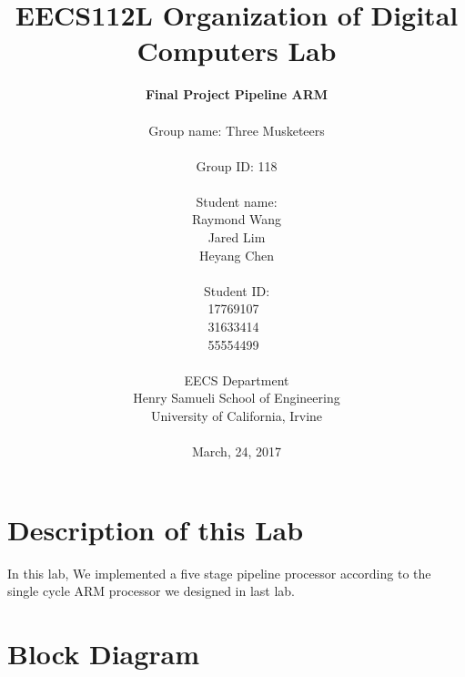 \documentclass{article}
\begin{document}
\title{EECS112L Organization of Digital Computers Lab}
\author{\textbf{Final Project} \textbf{Pipeline ARM} \\ \\
Group name: Three Musketeers \\ \\ Group ID: 118 \\ \\ Student name: \\ Raymond Wang \\ Jared Lim\\ Heyang Chen \\ \\ Student ID: \\17769107~\\31633414~\\55554499~\\ \\ 
EECS Department\\ Henry Samueli School of Engineering \\ University of California, Irvine \\ \\
{March, 24, 2017}} 


\date{}
\maketitle

\newpage

\section{Description of this Lab}

In this lab, We implemented a five stage pipeline processor according to the single cycle ARM processor we designed in last lab.

\section{Block Diagram}
\end{document}
